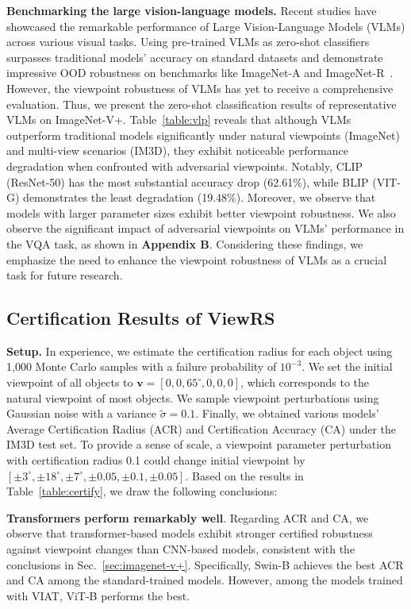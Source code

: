 \documentclass[10pt,journal,compsoc]{IEEEtran}
\begin{document}
\noindent \textbf{Benchmarking the large vision-language models.} Recent studies have showcased the remarkable performance of Large Vision-Language Models (VLMs) across various visual tasks. Using pre-trained VLMs as zero-shot classifiers surpasses traditional models' accuracy on standard datasets and demonstrate impressive OOD robustness on benchmarks like ImageNet-A and ImageNet-R~\cite{radford2021learning}. However, the viewpoint robustness of VLMs has yet to receive a comprehensive evaluation. Thus, we present the zero-shot classification results of representative VLMs on ImageNet-V+. Table~\ref{table:vlp} reveals that although VLMs outperform traditional models significantly under natural viewpoints (ImageNet) and multi-view scenarios (IM3D), they exhibit noticeable performance degradation when confronted with adversarial viewpoints. Notably, CLIP (ResNet-50) has the most substantial accuracy drop (62.61\%), while BLIP (VIT-G) demonstrates the least degradation (19.48\%). Moreover, we observe that models with larger parameter sizes exhibit better viewpoint robustness. We also observe the significant impact of adversarial viewpoints on VLMs' performance in the VQA task, as shown in \textbf{Appendix B}. Considering these findings, we emphasize the need to enhance the viewpoint robustness of VLMs as a crucial task for future research.



\subsection{Certification Results of ViewRS}
\noindent \textbf{Setup.} In experience, we estimate the certification radius for each object using 1,000 Monte Carlo samples with a failure probability of $10^{-3}$. We set the initial viewpoint of all objects to $\mathbf{v}\!\! = \!\![ 0,0,65^{\circ},0, 0, 0 ]$, which corresponds to the natural viewpoint of most objects. We sample viewpoint perturbations using Gaussian noise with a variance $\tilde{\sigma}\!\!=\!\!0.1$. Finally, we obtained various models' Average Certification Radius (ACR) and Certification Accuracy (CA) under the IM3D test set. To provide a sense of scale, a viewpoint parameter perturbation with certification radius 0.1 could change initial viewpoint by $[\pm3^{\circ},\pm18^{\circ}, \pm7^{\circ},\pm 0.05,\pm 0.1,\pm 0.05]$. Based on the results in Table~\ref{table:certify}, we draw the following conclusions:

\noindent \textbf{Transformers perform remarkably well}. Regarding ACR and CA, we observe that transformer-based models exhibit stronger certified robustness against viewpoint changes than CNN-based models, consistent with the conclusions in Sec.~\ref{sec:imagenet-v+}. Specifically, Swin-B achieves the best ACR and CA among the standard-trained models. However, among the models trained with VIAT, ViT-B performs the best.
\end{document}
